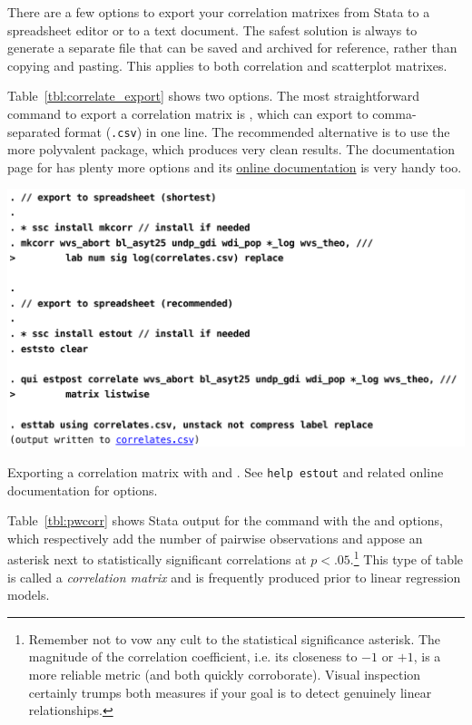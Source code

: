 There are a few options to export your correlation matrixes from Stata to a spreadsheet editor or to a text document. The safest solution is always to generate a separate file that can be saved and archived for reference, rather than copying and pasting. This applies to both correlation and scatterplot matrixes.

Table~\ref{tbl:correlate_export} shows two options. The most straightforward command to export a correlation matrix is , which can export to comma-separated format (\texttt{.csv}) in one line. The recommended alternative is to use the more polyvalent  package, which produces very clean results. The documentation page for  has plenty more options and its \href{http://repec.org/bocode/e/estout/estpost.html#estpost112}{online documentation} is very handy too.

\begin{table}[htp]
	\includegraphics[scale=.5]{images/correlate_export.pdf}

	\caption[Exporting a correlation matrix with  and ]{\label{tbl:correlate_export}
	Exporting a correlation matrix with  and . See \texttt{help estout} and related online documentation for options.\\
	}
\end{table}%

Table~\ref{tbl:pwcorr} shows Stata output for the  command with the  and  options, which respectively add the number of pairwise observations and appose an asterisk next to statistically significant correlations at $p < .05$.\footnote{Remember not to vow any cult to the statistical significance asterisk. The magnitude of the correlation coefficient, i.e. its closeness to $-1$ or $+1$, is a more reliable metric (and both quickly corroborate). Visual inspection certainly trumps both measures if your goal is to detect genuinely linear relationships.} This type of table is called a \emph{correlation matrix} and is frequently produced prior to linear regression models.

